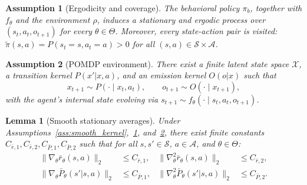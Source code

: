 \documentclass[10pt,a4paper]{amsart}
\newtheorem{assumption}{Assumption}
\newtheorem{lemma}{Lemma}
\renewcommand{\tilde}{\widetilde}
\begin{document}
\begin{assumption}[Ergodicity and coverage]\label{ass:ergodic}
The behavioral policy $\pi_b$, together with $f_\theta$ and the environment $\rho$,
induces a stationary and ergodic process over $(s_t, a_t, o_{t+1})$ for every
$\theta \in \Theta$. Moreover, every state-action pair is visited:
$\tilde{\pi}(s,a) = P(s_t{=}s, a_t{=}a) > 0$ for all $(s,a) \in \mathcal{S}\times\mathcal{A}$.
\end{assumption}

\begin{assumption}[POMDP environment]\label{ass:pomdp}
There exist a finite latent state space $\mathcal{X}$, a transition kernel $P(x'|x,a)$,
and an emission kernel $O(o|x)$ such that
\begin{equation*}
  x_{t+1} \sim P(\cdot \mid x_t, a_t),
  \qquad
  o_{t+1} \sim O(\cdot \mid x_{t+1}),
\end{equation*}
with the agent's internal state evolving via
$s_{t+1} \sim f_\theta(\cdot \mid s_t, a_t, o_{t+1})$.
\end{assumption}

\begin{lemma}[Smooth stationary averages]\label{lem:surrogate_bounds}
Under Assumptions~\ref{ass:smooth_kernel},~\ref{ass:ergodic},
and~\ref{ass:pomdp}, there exist finite constants
$C_{\bar{r},1}, C_{\bar{r},2}, C_{\bar{P},1}, C_{\bar{P},2}$ such that for all
$s, s' \in \mathcal{S}$, $a \in \mathcal{A}$, and $\theta \in \Theta$:
\begin{align*}
  \|\nabla_\theta \bar{r}_\theta(s,a)\|_2 &\le C_{\bar{r},1},
  &\|\nabla^2_\theta \bar{r}_\theta(s,a)\|_2 &\le C_{\bar{r},2},\\
  \|\nabla_\theta \bar{P}_\theta(s'|s,a)\|_2 &\le C_{\bar{P},1},
  &\|\nabla^2_\theta \bar{P}_\theta(s'|s,a)\|_2 &\le C_{\bar{P},2}.
\end{align*}
\end{lemma}
\end{document}
